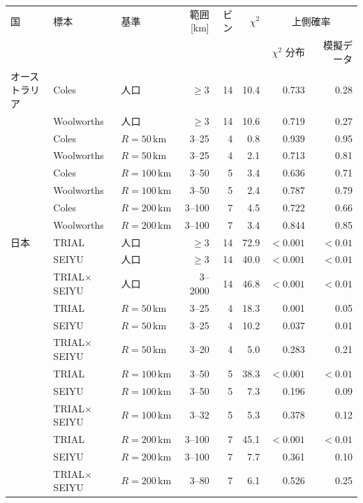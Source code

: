 \begin{tabular}{lllrrrrr}
\toprule
国 & 標本 & 基準 & 範囲 [km] & ビン & $\chi^2$ & \multicolumn{2}{c}{上側確率} \\
& & & & & & $\chi^2$ 分布 & 模擬データ \\
\midrule
オーストラリア & Coles & 人口 & $\geq 3$ & 14 & 10.4 & 0.733 & 0.28 \\
 & Woolworths & 人口 & $\geq 3$ & 14 & 10.6 & 0.719 & 0.27 \\
 & Coles & $R = 50\,\mathrm{km}$ & 3--25 & 4 & 0.8 & 0.939 & 0.95 \\
 & Woolworths & $R = 50\,\mathrm{km}$ & 3--25 & 4 & 2.1 & 0.713 & 0.81 \\
 & Coles & $R = 100\,\mathrm{km}$ & 3--50 & 5 & 3.4 & 0.636 & 0.71 \\
 & Woolworths & $R = 100\,\mathrm{km}$ & 3--50 & 5 & 2.4 & 0.787 & 0.79 \\
 & Coles & $R = 200\,\mathrm{km}$ & 3--100 & 7 & 4.5 & 0.722 & 0.66 \\
 & Woolworths & $R = 200\,\mathrm{km}$ & 3--100 & 7 & 3.4 & 0.844 & 0.85 \\
\midrule
日本 & TRIAL & 人口 & $\geq 3$ & 14 & 72.9 & $< 0.001$ & $< 0.01$ \\
 & SEIYU & 人口 & $\geq 3$ & 14 & 40.0 & $< 0.001$ & $< 0.01$ \\
 & TRIAL$\times$SEIYU & 人口 & 3--2000 & 14 & 46.8 & $< 0.001$ & $< 0.01$ \\
 & TRIAL & $R = 50\,\mathrm{km}$ & 3--25 & 4 & 18.3 & 0.001 & 0.05 \\
 & SEIYU & $R = 50\,\mathrm{km}$ & 3--25 & 4 & 10.2 & 0.037 & 0.01 \\
 & TRIAL$\times$SEIYU & $R = 50\,\mathrm{km}$ & 3--20 & 4 & 5.0 & 0.283 & 0.21 \\
 & TRIAL & $R = 100\,\mathrm{km}$ & 3--50 & 5 & 38.3 & $< 0.001$ & $< 0.01$ \\
 & SEIYU & $R = 100\,\mathrm{km}$ & 3--50 & 5 & 7.3 & 0.196 & 0.09 \\
 & TRIAL$\times$SEIYU & $R = 100\,\mathrm{km}$ & 3--32 & 5 & 5.3 & 0.378 & 0.12 \\
 & TRIAL & $R = 200\,\mathrm{km}$ & 3--100 & 7 & 45.1 & $< 0.001$ & $< 0.01$ \\
 & SEIYU & $R = 200\,\mathrm{km}$ & 3--100 & 7 & 7.7 & 0.361 & 0.10 \\
 & TRIAL$\times$SEIYU & $R = 200\,\mathrm{km}$ & 3--80 & 7 & 6.1 & 0.526 & 0.25 \\
\bottomrule
\end{tabular}
